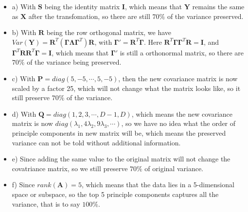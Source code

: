 \documentclass{article}
\begin{document}
\begin{itemize}
	\item a) With $\bm{S}$ being the identity matrix $\bm{I}$, which means that $\bm{Y}$ remains the same as $\bm{X}$ after the transfomation, so there are still $70\% $ of the variance preserved.
	
	\item b) With $\bm{R}$ being the row orthogonal matrix, we have $ Var(\bm{Y}) = \bm{R}^T (\bm{\Gamma \Lambda} \bm{\Gamma}^T) \bm{R}$, with $\bm{\Gamma}' = \bm{R}^T\bm{\Gamma}$. Here $\bm{R}^T\bm{\Gamma} \bm{\Gamma}^T\bm{R} = \bm{I}$, and $\bm{\Gamma}^T\bm{R}\bm{R}^T\bm{\Gamma} = \bm{I}$, which means that $\bm{\Gamma}'$ is still a orthonormal matrix, so there are $70\%$ of the variance being preserved.
	
	\item c) With $\bm{P} = diag(5, -5, \cdots, 5, -5)$, then the new covariance matrix is now scaled by a factor 25, which will not change what the matrix looks like, so it still preserve $70\%$ of the variance.
	
	\item d) With $\bm{Q} = diag(1,2,3, \cdots, D-1, D)$, which means the new covariance matrix is now $diag(\lambda_1, 4\lambda_2, 9\lambda_3, \cdots)$, so we have no idea what the order of principle components in new matrix will be, which means the preserved variance can not be told without additional information.
	
	\item e) Since adding the same value to the original matrix will not change the covatriance matrix, so we still preserve $70\%$ of original variance.
	
	\item f) Since $rank(\bm{A}) = 5$, which means that the data lies in a 5-dimensional space or subspace, so the top 5 principle components captures all the variance, that is to say $100\%$.

\end{itemize}
\end{document}

